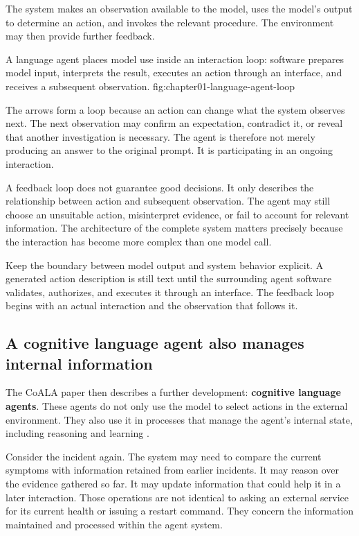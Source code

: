 The system makes an observation available to the model, uses the model's output to determine an action, and invokes the relevant procedure. The environment may then provide further feedback.

  {A language agent places model use inside an interaction loop: software prepares model input, interprets the result, executes an action through an interface, and receives a subsequent observation.}
  {fig:chapter01-language-agent-loop}

The arrows form a loop because an action can change what the system observes next. The next observation may confirm an expectation, contradict it, or reveal that another investigation is necessary. The agent is therefore not merely producing an answer to the original prompt. It is participating in an ongoing interaction.

A feedback loop does not guarantee good decisions. It only describes the relationship between action and subsequent observation. The agent may still choose an unsuitable action, misinterpret evidence, or fail to account for relevant information. The architecture of the complete system matters precisely because the interaction has become more complex than one model call.

\begin{tipbox}
Keep the boundary between model output and system behavior explicit. A generated action description is still text until the surrounding agent software validates, authorizes, and executes it through an interface. The feedback loop begins with an actual interaction and the observation that follows it.
\end{tipbox}

\subsection{A cognitive language agent also manages internal information}\label{a-cognitive-language-agent-also-manages-internal-information}

The CoALA paper then describes a further development: \textbf{cognitive language agents}. These agents do not only use the model to select actions in the external environment. They also use it in processes that manage the agent's internal state, including reasoning and learning .

Consider the incident again. The system may need to compare the current symptoms with information retained from earlier incidents. It may reason over the evidence gathered so far. It may update information that could help it in a later interaction. Those operations are not identical to asking an external service for its current health or issuing a restart command. They concern the information maintained and processed within the agent system.

